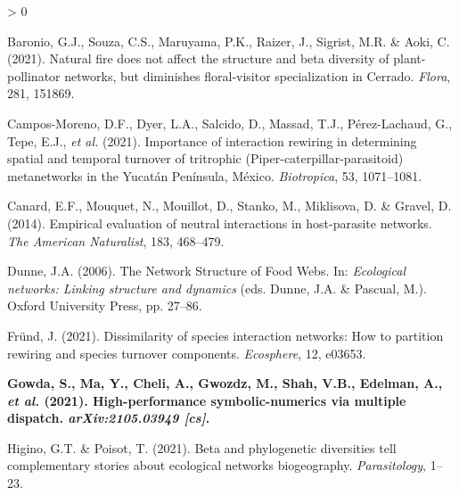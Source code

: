 \documentclass[11pt]{article}
\makeatletter
\def\maxwidth{\ifdim\Gin@nat@width>\linewidth\linewidth
\else\Gin@nat@width\fi}
\let\Oldincludegraphics\includegraphics
\renewcommand{\includegraphics}[1]{\Oldincludegraphics[width=\maxwidth]{#1}}
\newlength{\cslhangindent}
\newenvironment{CSLReferences}[3] %
 {%
  \setlength{\parindent}{0pt}
  \ifodd #1 \everypar{\setlength{\hangindent}{\cslhangindent}}\ignorespaces\fi
  \ifnum #2 > 0
  \setlength{\parskip}{#2\baselineskip}
  \fi
 }%
 {}
\providecommand{\DIFaddtex}[1]{{\bf #1}} %
\providecommand{\DIFdeltex}[1]{} %
\providecommand{\DIFaddbegin}{\protect\color{blue}} %
\providecommand{\DIFaddend}{\protect\color{black}} %
\providecommand{\DIFdelbegin}{\protect\color{red}} %
\providecommand{\DIFdelend}{\protect\color{black}} %
\providecommand{\DIFadd}[1]{\texorpdfstring{\DIFaddtex{#1}}{#1}} %
\providecommand{\DIFdel}[1]{\texorpdfstring{\DIFdeltex{#1}}{}} %
\newcommand{\DIFscaledelfig}{0.5}
\newlength{\DIFdelgraphicswidth} %
\newlength{\DIFdelgraphicsheight} %
\newcommand{\DIFaddincludegraphics}[2][]{{\color{blue}\fbox{\DIFOincludegraphics[#1]{#2}}}} %
\newcommand{\DIFdelincludegraphics}[2][]{%
\sbox{\DIFdelgraphicsbox}{\DIFOincludegraphics[#1]{#2}}%
\settoboxwidth{\DIFdelgraphicswidth}{\DIFdelgraphicsbox} %
\settoboxtotalheight{\DIFdelgraphicsheight}{\DIFdelgraphicsbox} %
\scalebox{\DIFscaledelfig}{%
\parbox[b]{\DIFdelgraphicswidth}{\usebox{\DIFdelgraphicsbox}\\[-\baselineskip] \rule{\DIFdelgraphicswidth}{0em}}\llap{\resizebox{\DIFdelgraphicswidth}{\DIFdelgraphicsheight}{%
\setlength{\unitlength}{\DIFdelgraphicswidth}%
\begin{picture}(1,1)%
\thicklines\linethickness{2pt} %
{\color[rgb]{1,0,0}\put(0,0){\framebox(1,1){}}}%
{\color[rgb]{1,0,0}\put(0,0){\line( 1,1){1}}}%
{\color[rgb]{1,0,0}\put(0,1){\line(1,-1){1}}}%
\end{picture}%
}\hspace*{3pt}}} %
} %
\DeclareRobustCommand{\DIFaddbegin}{\DIFOaddbegin \let\includegraphics\DIFaddincludegraphics} %
\DeclareRobustCommand{\DIFaddend}{\DIFOaddend \let\includegraphics\DIFOincludegraphics} %
\DeclareRobustCommand{\DIFdelbegin}{\DIFOdelbegin \let\includegraphics\DIFdelincludegraphics} %
\DeclareRobustCommand{\DIFdelend}{\DIFOaddend \let\includegraphics\DIFOincludegraphics} %
\makeatother
\begin{document}
\hypertarget{refs}{}
\begin{CSLReferences}{1}{0}
\leavevmode\DIFdelbegin %
\DIFdel{Banville, F. , Vissault, S. \& Poisot, T.
(2021). Mangal.jl and
EcologicalNetworks.jl: Two complementary packages for analyzing
ecological networks in Julia. \emph{Journal of Open Source Software}, 6, 2721.
}%

\DIFdelend \hypertarget{ref-Baronio2021NatFir}{}%
Baronio, G.J., Souza, C.S., Maruyama, P.K., Raizer, J., Sigrist, M.R. \&
Aoki, C. (2021). Natural fire does not affect the structure and beta
diversity of plant-pollinator networks, but diminishes floral-visitor
specialization in Cerrado. \emph{Flora}, 281, 151869.

\leavevmode\hypertarget{ref-Campos-Moreno2021ImpInt}{}%
Campos-Moreno, D.F., Dyer, L.A., Salcido, D., Massad, T.J.,
Pérez-Lachaud, G., Tepe, E.J., \emph{et al.} (2021). Importance of
interaction rewiring in determining spatial and temporal turnover of
tritrophic (Piper-caterpillar-parasitoid) metanetworks in the Yucatán
Península, México. \emph{Biotropica}, 53, 1071--1081.

\leavevmode\hypertarget{ref-Canard2014EmpEva}{}%
Canard, E.F., Mouquet, N., Mouillot, D., Stanko, M., Miklisova, D. \&
Gravel, D. (2014). Empirical evaluation of neutral interactions in
host-parasite networks. \emph{The American Naturalist}, 183, 468--479.

\leavevmode\hypertarget{ref-Dunne2006NetStr}{}%
Dunne, J.A. (2006). The Network Structure of Food Webs. In:
\emph{Ecological networks: Linking structure and dynamics} (eds. Dunne,
J.A. \& Pascual, M.). Oxford University Press, pp. 27--86.

\leavevmode\hypertarget{ref-Frund2021DisSpe}{}%
Fründ, J. (2021). Dissimilarity of species interaction networks: How to
partition rewiring and species turnover components. \emph{Ecosphere},
12, e03653.

\leavevmode\DIFaddbegin \hypertarget{ref-Gowda2021HigSym}{}%
\DIFadd{Gowda, S., Ma, Y., Cheli, A., Gwozdz, M., Shah, V.B., Edelman, A.,
\emph{et al.} (2021). High-performance symbolic-numerics via multiple
dispatch. \emph{arXiv:2105.03949 {[}cs{]}}.
}

\leavevmode\DIFaddend \hypertarget{ref-Higino2021BetPhy}{}%
Higino, G.T. \& Poisot, T. (2021). Beta and phylogenetic diversities
tell complementary stories about ecological networks biogeography.
\emph{Parasitology}, 1--23.


\end{CSLReferences}
\end{document}
